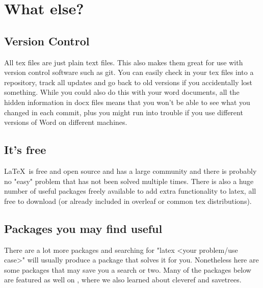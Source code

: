 \section{What else?}

\subsection{Version Control}

All tex files are just plain text files. This also makes them great for use with version control software such as git.
You can easily check in your tex files into a repository, track all updates and go back to old versions if you accidentally lost something.
While you could also do this with your word documents, all the hidden information in docx files means that you won't be able to see what you changed in each commit, plus you might run into trouble if you use different versions of Word on different machines.

\subsection{It's free}

\LaTeX~is free and open source and has a large community and there is probably no "easy" problem that has not been solved multiple times.
There is also a huge number of useful packages freely available to add extra functionality to latex, all free to download (or already included in overleaf or common tex distributions).

\subsection{Packages you may find useful}
There are a lot more packages and searching for "latex <your problem/use case>" will usually produce a package that solves it for you. Nonetheless here are some packages that may save you a search or two. Many of the packages below are featured as well on \cite{isaksson_2020}, where we also learned about cleveref and savetrees.

